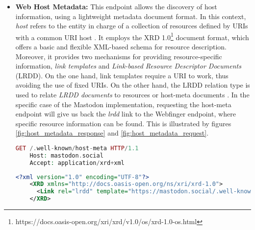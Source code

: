 \begin{itemize}
  \item \textbf{Web Host Metadata:}
    This endpoint allows the discovery of host information, using a lightweight metadata document format. In this context, \emph{host} refers to the entity in charge of a collection of resources defined by URIs with a common URI host \cite{cook_2011}. It employs the XRD 1.0\footnote{https://docs.oasis-open.org/xri/xrd/v1.0/os/xrd-1.0-os.html} document format, which offers a basic and flexible XML-based schema for resource description. Moreover, it provides two mechanisms for providing resource-specific information, \emph{link templates} and \emph{Link-based Resource Descriptor Documents} (LRDD). On the one hand, link templates require a URI to work, thus avoiding the use of fixed URIs. On the other hand, the LRDD relation type is used to relate \emph{LRDD documents} to resources or host-meta documents \cite{cook_2011}. In the specific case of the Mastodon implementation, requesting the host-meta endpoint will give us back the \emph{lrdd} link to the Webfinger endpoint, where specific resource information can be found. This is illustrated by figures \ref{fig:host_metadata_response} and \ref{fig:host_metadata_request}.

    \pagebreak
\lstset{style=JSONStyle}
\begin{lstlisting}[language=PHP, caption=Web Host Metadata request to mastodon.social, label=fig:host_metadata_request, float=ht]
    GET /.well-known/host-meta HTTP/1.1
    Host: mastodon.social
    Accept: application/xrd+xml
\end{lstlisting}

\lstset{style=JSONStyle}
\begin{lstlisting}[language=XML, caption=Web Host metadata response from mastodon.social, label=fig:host_metadata_response, float=h!]
    <?xml version="1.0" encoding="UTF-8"?>
    <XRD xmlns="http://docs.oasis-open.org/ns/xri/xrd-1.0">
      <Link rel="lrdd" template="https://mastodon.social/.well-known/webfinger?resource={uri}"/>
    </XRD>
\end{lstlisting}


\end{itemize}

